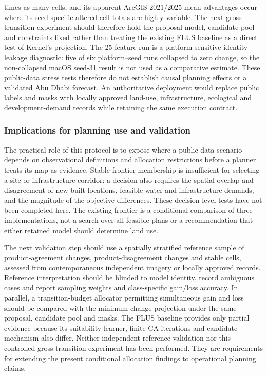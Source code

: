 times as many cells, and its apparent ArcGIS 2021/2025 mean advantages
occur where its seed-specific altered-cell totals are highly variable.
The next gross-transition experiment should therefore hold the proposal
model, candidate pool and constraints fixed rather than treating the
existing FLUS baseline as a direct test of Kernel's projection. The
25-feature run is a platform-sensitive identity-leakage diagnostic: five
of six platform--seed runs collapsed to zero change, so the
non-collapsed macOS seed-31 result is not used as a comparative
estimate. These public-data stress tests therefore do not establish
causal planning effects or a validated Abu Dhabi forecast. An
authoritative deployment would replace public labels and masks with
locally approved land-use, infrastructure, ecological and
development-demand records while retaining the same execution contract.

\subsubsection{Implications for planning use and
validation}\label{implications-for-planning-use-and-validation}

The practical role of this protocol is to expose where a public-data
scenario depends on observational definitions and allocation
restrictions before a planner treats its map as evidence. Stable
frontier membership is insufficient for selecting a site or
infrastructure corridor: a decision also requires the spatial overlap
and disagreement of new-built locations, feasible water and
infrastructure demands, and the magnitude of the objective differences.
These decision-level tests have not been completed here. The existing
frontier is a conditional comparison of three implementations, not a
search over all feasible plans or a recommendation that either retained
model should determine land use.

The next validation step should use a spatially stratified reference
sample of product-agreement changes, product-disagreement changes and
stable cells, assessed from contemporaneous independent imagery or
locally approved records. Reference interpretation should be blinded to
model identity, record ambiguous cases and report sampling weights and
class-specific gain/loss accuracy. In parallel, a transition-budget
allocator permitting simultaneous gain and loss should be compared with
the minimum-change projection under the same proposal, candidate pool
and masks. The FLUS baseline provides only partial evidence because its
suitability learner, finite CA iterations and candidate mechanism also
differ. Neither independent reference validation nor this controlled
gross-transition experiment has been performed. They are requirements
for extending the present conditional allocation findings to operational
planning claims.

